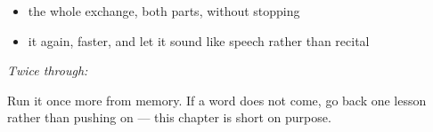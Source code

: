 \begin{itemize}
\raggedright
  \item the whole exchange, both parts, without stopping
  \item it again, faster, and let it sound like speech rather than recital
\end{itemize}

\emph{Twice through:}

\begin{tcolorbox}[breakable,colback=teal!4,colframe=teal!35!black,title={Before you move on}]
Run it once more from memory. If a word does not come, go back one lesson rather than pushing on — this chapter is short on purpose.
\end{tcolorbox}

